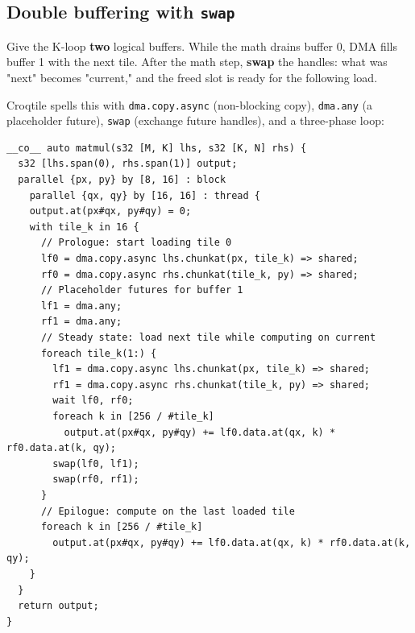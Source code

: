 \subsection*{Double buffering with \texttt{swap}}

Give the K-loop \textbf{two} logical buffers. While the math drains buffer 0, DMA fills buffer 1 with the next tile. After the math step, \textbf{swap} the handles: what was "next" becomes "current," and the freed slot is ready for the following load.

Croqtile spells this with \texttt{dma.copy.async} (non-blocking copy), \texttt{dma.any} (a placeholder future), \texttt{swap} (exchange future handles), and a three-phase loop:

\begin{lstlisting}[language=croqtile,caption={Double buffering with swap}]
__co__ auto matmul(s32 [M, K] lhs, s32 [K, N] rhs) {
  s32 [lhs.span(0), rhs.span(1)] output;
  parallel {px, py} by [8, 16] : block
    parallel {qx, qy} by [16, 16] : thread {
    output.at(px#qx, py#qy) = 0;
    with tile_k in 16 {
      // Prologue: start loading tile 0
      lf0 = dma.copy.async lhs.chunkat(px, tile_k) => shared;
      rf0 = dma.copy.async rhs.chunkat(tile_k, py) => shared;
      // Placeholder futures for buffer 1
      lf1 = dma.any;
      rf1 = dma.any;
      // Steady state: load next tile while computing on current
      foreach tile_k(1:) {
        lf1 = dma.copy.async lhs.chunkat(px, tile_k) => shared;
        rf1 = dma.copy.async rhs.chunkat(tile_k, py) => shared;
        wait lf0, rf0;
        foreach k in [256 / #tile_k]
          output.at(px#qx, py#qy) += lf0.data.at(qx, k) * rf0.data.at(k, qy);
        swap(lf0, lf1);
        swap(rf0, rf1);
      }
      // Epilogue: compute on the last loaded tile
      foreach k in [256 / #tile_k]
        output.at(px#qx, py#qy) += lf0.data.at(qx, k) * rf0.data.at(k, qy);
    }
  }
  return output;
}
\end{lstlisting}
